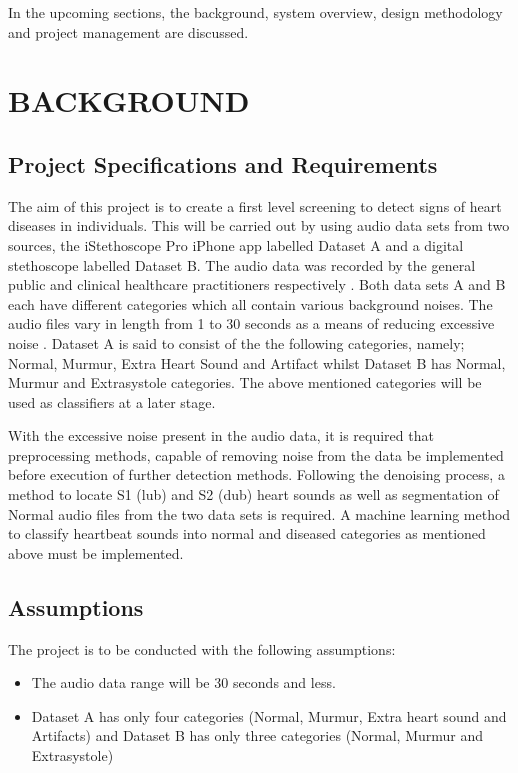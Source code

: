 \documentclass[10pt,twocolumn]{witseiepaper}
\begin{document}
In the upcoming sections, the background, system overview, design methodology and project management are discussed.

\section{BACKGROUND}
\subsection{Project Specifications and Requirements}
\label{PSR}
The aim of this project is to create a first level screening to detect signs of heart diseases in individuals. This will be carried out by using audio data sets from two sources, the iStethoscope Pro iPhone app labelled Dataset A and a digital stethoscope labelled Dataset B. The audio data was recorded by the general public and clinical healthcare practitioners respectively \cite{pascal}. Both data sets A and B each have different categories which all contain various background noises. The audio files vary in length from 1 to 30 seconds as a means of reducing excessive noise \cite{pascal}. Dataset A is said to consist of the the following categories, namely; Normal, Murmur, Extra Heart Sound and Artifact whilst Dataset B has Normal, Murmur and Extrasystole categories. The above mentioned categories will be used as classifiers at a later stage.

With the excessive noise present in the audio data, it is required that preprocessing methods, capable of removing noise from the data be implemented before execution of further detection methods. Following the denoising process, a method to locate S1 (lub) and S2 (dub) heart sounds as well as segmentation of Normal audio files from the two data sets is required. A machine learning method to classify heartbeat sounds into normal and diseased categories as mentioned above must be implemented.


\subsection{Assumptions}
The project is to be conducted with the following assumptions:

\begin{itemize}
    \item The audio data range will be 30 seconds and less.
    \item Dataset A has only four categories (Normal, Murmur, Extra heart sound and Artifacts) and Dataset B has only three categories (Normal, Murmur and Extrasystole)
\end{itemize}
\end{document}
